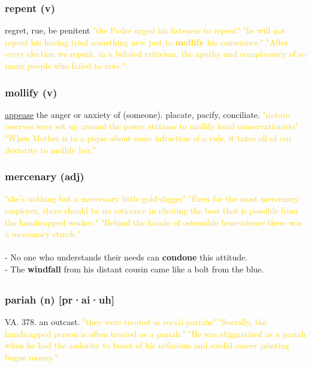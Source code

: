 \documentclass{proc}
\begin{document}
	\subsubsection{\textcolor{brickred}{repent} (v)}
	regret, rue, be penitent
	\textcolor{gold}{"the Padre urged his listeners to repent" "he will not repent his having tried something new just to \textbf{mollify} his conscience." "After every election we repent, in a belated criticism, the apathy and complacency of so many people who failed to vote."}
	
	\subsubsection{\textcolor{brickred}{mollify} (v)}
	\underline{appease} the anger or anxiety of (someone). placate, pacify, conciliate.
	\textcolor{gold}{"nature reserves were set up around the power stations to mollify local conservationists" "When Mother is in a pique about some infraction of a rule, it takes all of our dexterity to mollify her."}
	
	\subsubsection{\textcolor{brickred}{mercenary} (adj)}
	\textcolor{gold}{"she's nothing but a mercenary little gold-digger" "Even for the most mercenary employer, there should be no reticence in eliciting the best that is possible from the handicapped worker." "Behind the facade of ostensible  benevolence there was a mercenary streak."}\\\\
	- No one who understands their needs can \textbf{condone} this attitude.\\
	- The \textbf{windfall} from his distant cousin came like a bolt from the blue. 
	
	\newpage
	\subsection{}
	\subsubsection{\textcolor{brickred}{pariah} (n) [pr·ai·uh]}
	VA. 378. an outcast.
	\textcolor{gold}{"they were treated as social pariahs" "Socially, the handicapped person is often treated as a pariah." "He was stigmatized as a pariah when he had the audacity to boast of his nefarious and sordid career printing bogus money."}
	
\end{document}
